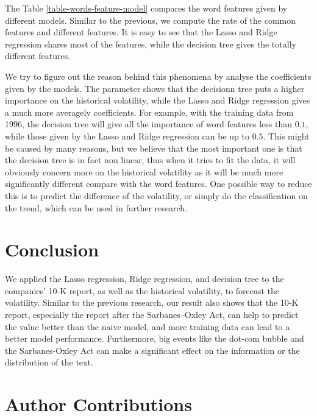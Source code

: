 \documentclass[11pt]{article}
\renewcommand\thesection{\arabic{section}}
\begin{document}
The Table \ref{table-words-feature-model} compares the word features given by different models. Similar to the previous, we compute the rate of the common features and different features. It is easy to see that the Lasso and Ridge regression shares most of the features, while the decision tree gives the totally different features.

We try to figure out the reason behind this phenomena by analyse the coefficients  given by the models. The parameter shows that the decisionn tree puts a higher importance on the historical volatility, while the Lasso and Ridge regression gives a much more averagely coefficients. For example, with the training data from 1996, the decision tree will give all the importance of word features less than $0.1$, while those given by the Lasso and Ridge regression can be up to $0.5$. This might be caused by many reasons, but we believe that the most important one is that the decision tree is in fact non linear, thus when it tries to fit the data, it will obviously concern more on the historical volatility as it will be much more significantly different compare with the word features. One possible way to reduce this is to predict the difference of the volatility, or simply do the classification on the trend, which can be used in further research.

\section{Conclusion}

We applied the Lasso regression, Ridge regression, and decision tree to the companies' 10-K report, as well as the historical volatility, to forecast the volatility. Similar to the previous research\cite{kogan2009predicting}, our result also shows that the 10-K report, especially the report after the Sarbanes–Oxley Act, can help to predict the value better than the naive model, and more training data can lead to a better model performance. Furthermore, big events like the dot-com bubble and the Sarbanes-Oxley Act can make a significant effect on the information or the distribution of the text.

\newpage




\newpage

\appendix
\renewcommand\thesection{\Alph{section}}

\section{Author Contributions}
\end{document}
